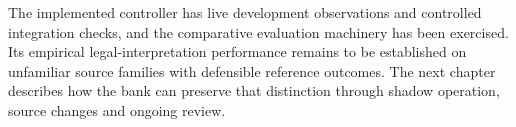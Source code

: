 The implemented controller has live development observations and controlled
integration checks, and the comparative evaluation machinery has been exercised.
Its empirical legal-interpretation performance remains to be established on
unfamiliar source families with defensible reference outcomes. The next chapter describes how the bank
can preserve that distinction through shadow operation, source changes and
ongoing review.
